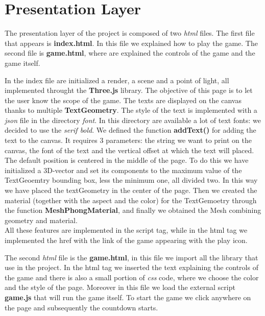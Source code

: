 \documentclass[a4paper, 11pt, titlepage]{report}
\begin{document}
\chapter{Presentation Layer}
	\par The presentation layer of the project is composed of two \emph{html} files. The first file that appears is \textbf{index.html}. In this file we explained how to play the game. The second file is \textbf{game.html}, where are explained the controls of the game and the game itself. \\
	\par In the index file are initialized a render, a scene and a point of light, all implemented throught the \textbf{Three.js} library. The objective of this page is to let the user know the scope of the game. The texts are displayed on the canvas thanks to multiple \textbf{TextGeometry}.
	The style of the text is implemented with a \emph{json} file in the directory \emph{font}.
	In this directory are available a lot of text fonts: we decided to use the \emph{serif bold}. We defined the function \textbf{addText()} for adding the text to the canvas. It requires 3 parameters: the string we want to print on the canvas, the font of the text and the vertical offset at which the text will placed. The default position is centered in the middle of the page. To do this we have initialized a 3D-vector and set its components to the maximum value of the TextGeoemtry bounding box, less the minimum one, all divided two. In this way we have placed the textGeometry in the center of the page.
	Then we created the material (together with the aspect and the color) for the TextGemoetry through the function \textbf{MeshPhongMaterial}, and finally we obtained the Mesh combining geometry and material. \\
	All these features are implemented in the script tag, while in the html tag we implemented the href with the link of the game appearing with the play icon. \\
	\par The second \emph{html} file is the \textbf{game.html}, in this file we import all the library that use in the project. In the html tag we inserted the text explaining the controls of the game and there is also a small portion of \emph{css} code, where we choose the color and the style of the page. Moreover in this file we load the external script \textbf{game.js} that will run the game itself. To start the game we click anywhere on the page and subsequently the countdown starts. 
\end{document}

